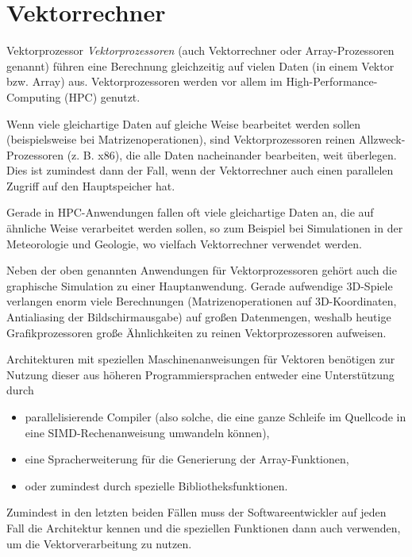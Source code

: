 \section{Vektorrechner}

\begin{defi}{Vektorprozessor}
    \emph{Vektorprozessoren} (auch Vektorrechner oder Array-Prozessoren genannt) führen eine Berechnung gleichzeitig auf vielen Daten (in einem Vektor bzw. Array) aus.
    Vektorprozessoren werden vor allem im High-Performance-Computing (HPC) genutzt.

    Wenn viele gleichartige Daten auf gleiche Weise bearbeitet werden sollen (beispielsweise bei Matrizenoperationen), sind Vektorprozessoren reinen Allzweck-Prozessoren (z. B. x86), die alle Daten nacheinander bearbeiten, weit überlegen.
    Dies ist zumindest dann der Fall, wenn der Vektorrechner auch einen parallelen Zugriff auf den Hauptspeicher hat.

    Gerade in HPC-Anwendungen fallen oft viele gleichartige Daten an, die auf ähnliche Weise verarbeitet werden sollen, so zum Beispiel bei Simulationen in der Meteorologie und Geologie, wo vielfach Vektorrechner verwendet werden.

    Neben der oben genannten Anwendungen für Vektorprozessoren gehört auch die graphische Simulation zu einer Hauptanwendung.
    Gerade aufwendige 3D-Spiele verlangen enorm viele Berechnungen (Matrizenoperationen auf 3D-Koordinaten, Antialiasing der Bildschirmausgabe) auf großen Datenmengen, weshalb heutige Grafikprozessoren große Ähnlichkeiten zu reinen Vektorprozessoren aufweisen.

    Architekturen mit speziellen Maschinenanweisungen für Vektoren benötigen zur Nutzung dieser aus höheren Programmiersprachen entweder eine Unterstützung durch
    \begin{itemize}
        \item parallelisierende Compiler (also solche, die eine ganze Schleife im Quellcode in eine SIMD-Rechenanweisung umwandeln können),
        \item eine Spracherweiterung für die Generierung der Array-Funktionen,
        \item oder zumindest durch spezielle Bibliotheksfunktionen.
    \end{itemize}
    Zumindest in den letzten beiden Fällen muss der Softwareentwickler auf jeden Fall die Architektur kennen und die speziellen Funktionen dann auch verwenden, um die Vektorverarbeitung zu nutzen.
\end{defi}

